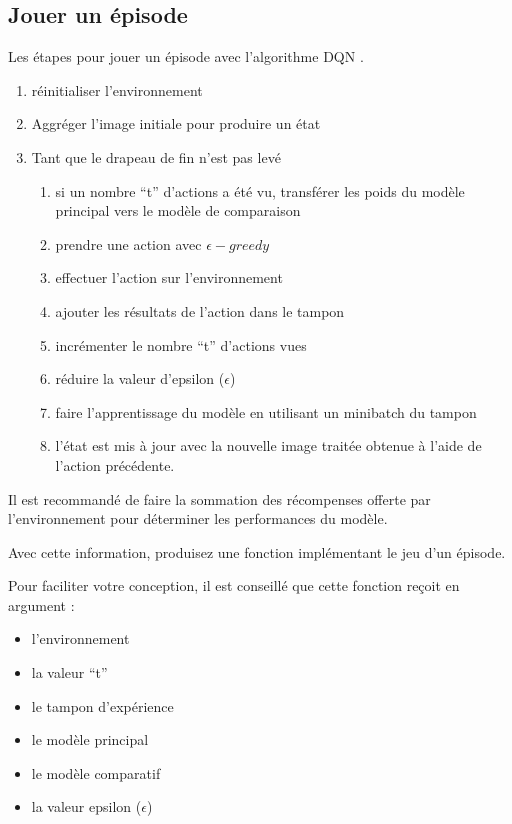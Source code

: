 \documentclass{article}
\begin{document}
\subsection{Jouer un épisode}
Les étapes pour jouer un épisode avec l'algorithme DQN \citep{DQN-Article}.
\bigbreak
\begin{enumerate}
  \item réinitialiser l'environnement
  \item Aggréger l'image initiale pour produire un état
  \item Tant que le drapeau de fin n'est pas levé
  \begin{enumerate}
    \item si un nombre ``t'' d'actions a été vu, transférer les poids du modèle principal vers le modèle de comparaison
    \item prendre une action avec $\epsilon-greedy$
    \item effectuer l'action sur l'environnement
    \item ajouter les résultats de l'action dans le tampon
    \item incrémenter le nombre ``t'' d'actions vues
    \item réduire la valeur d'epsilon ($\epsilon$)
    \item faire l'apprentissage du modèle en utilisant un minibatch du tampon
    \item l'état est mis à jour avec la nouvelle image traitée obtenue à l'aide de l'action précédente.
  \end{enumerate}
\end{enumerate}

\bigbreak
Il est recommandé de faire la sommation des récompenses offerte par l'environnement pour déterminer les performances du modèle.

\bigbreak
Avec cette information, produisez une fonction implémentant le jeu d'un épisode.

\bigbreak
Pour faciliter votre conception, il est conseillé que cette fonction reçoit en argument :
\bigbreak
\begin{itemize}
  \item l'environnement
  \item la valeur ``t''
  \item le tampon d'expérience
  \item le modèle principal
  \item le modèle comparatif
  \item la valeur epsilon ($\epsilon$)
\end{itemize}
\end{document}
